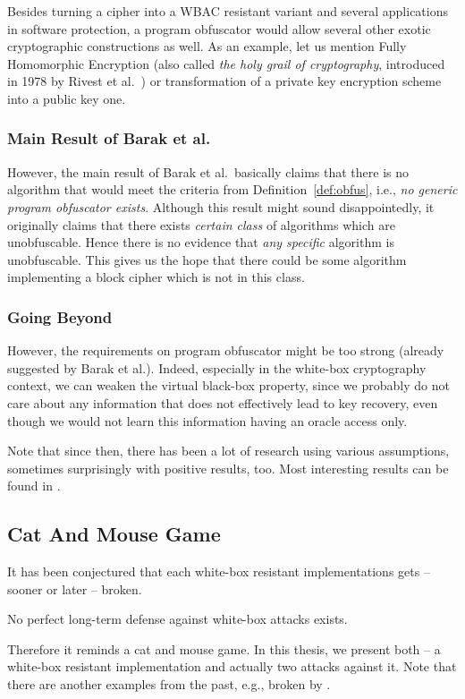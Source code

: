 	Besides turning a cipher into a WBAC resistant variant and several applications in software protection, a program obfuscator would allow several other exotic cryptographic constructions as well. As an example, let us mention Fully Homomorphic Encryption (also called {\em the holy grail of cryptography}, introduced in 1978 by Rivest et al.\ \cite{rivest1978data}) or transformation of a private key encryption scheme into a public key one.

\subsubsection{Main Result of Barak et al.}
	
	However, the main result of Barak et al.\ basically claims that there is no algorithm that would meet the criteria from Definition~\ref{def:obfus}, i.e., {\em no generic program obfuscator exists}. Although this result might sound disappointedly, it originally claims that there exists {\em certain class} of algorithms which are unobfuscable. Hence there is no evidence that {\em any specific} algorithm is unobfuscable. This gives us the hope that there could be some algorithm implementing a block cipher which is not in this class.

\subsubsection{Going Beyond}
	
	However, the requirements on program obfuscator might be too strong (already suggested by Barak et al.). Indeed, especially in the white-box cryptography context, we can weaken the virtual black-box property, since we probably do not care about any information that does not effectively lead to key recovery, even though we would not learn this information having an oracle access only.
	
	Note that since then, there has been a lot of research using various assumptions, sometimes surprisingly with positive results, too. Most interesting results can be found in \cite{barak2014protecting, brakerski2014virtual}.



\subsection{Cat And Mouse Game}
\label{sec:catmouse}

It has been conjectured that each white-box resistant implementations gets -- sooner or later -- broken.
\begin{conj}
	No perfect long-term defense against white-box attacks exists.
\end{conj}
Therefore it reminds a cat and mouse game. In this thesis, we present both -- a white-box resistant implementation and actually two attacks against it. Note that there are another examples from the past, e.g., \cite{chow2002des} broken by \cite{jacob2002attacking}.
